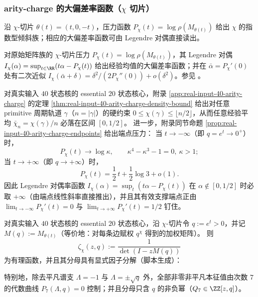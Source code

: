 \subsubsection{arity-charge 的大偏差率函数（\texorpdfstring{$\chi$}{chi} 切片）}\label{subsec:chi-ldp}
沿 $\chi$-切片 $\theta(t)=(t,0,-t)$，压力函数 $P_\chi(t)=\log\rho(M_{\theta(t)})$ 给出 $\chi$ 的指数型倾斜族；相应的大偏差率函数可由 Legendre 对偶直接读出。

\begin{remark}\label{thm:chi-gartner-ellis}
对原始矩阵族的 \(\chi\)-切片压力 \(P_\chi(t)=\log\rho(M_{\theta(t)})\)，其 Legendre 对偶
\(
I_\chi(\alpha)=\sup_{t\in\RR}(t\alpha-P_\chi(t))
\)
给出经验均值的大偏差率函数；并在 \(\bar\alpha=P_\chi'(0)\) 处有二次近似 \(I_\chi(\bar\alpha+\delta)=\delta^2/(2P_\chi''(0))+o(\delta^2)\)。参见 \cite{DemboZeitouni2010LargeDeviations}。
\end{remark}

\begin{remark}\label{rem:chi-ldp-endpoints}
对真实输入 $40$ 状态核的 essential $20$ 状态核心，附录 \ref{app:real-input-40-arity-charge} 的定理
\ref{thm:real-input-40-arity-charge-density-bound}
给出对任意 primitive 周期轨道 $\gamma$（$n=|\gamma|$）的硬约束
\(
0\le \chi(\gamma)\le \lfloor n/2\rfloor
\)，从而任意经验平均
\(
\bar\chi_n=\chi(\gamma)/n
\)
必落在区间 $[0,1/2]$。
进一步，附录同节命题 \ref{prop:real-input-40-arity-charge-endpoints} 给出端点压力：
当 $t\to-\infty$（即 $q=e^t\to 0^+$）时，
\[
P_\chi(t)\to \log\kappa,
\qquad
\kappa^4-\kappa^3-1=0,\ \kappa>1;
\]
当 $t\to+\infty$（即 $q\to+\infty$）时，
\[
P_\chi(t)=\frac12\,t+\frac12\log 3+o(1).
\]
因此 Legendre 对偶率函数 $I_\chi(\alpha)=\sup_t(t\alpha-P_\chi(t))$ 在 $\alpha\notin[0,1/2]$ 时必取 $+\infty$（由端点线性斜率直接推出），并且其有效支撑端点正由
\(
\lim_{t\to-\infty}P_\chi'(t)=0
\)
与
\(
\lim_{t\to+\infty}P_\chi'(t)=1/2
\)
钉住。
\end{remark}

\begin{proposition}\label{prop:chi-degree7-interface}
对真实输入 \(40\) 状态核的 essential \(20\) 状态核心，沿 \(\chi\)-切片令 \(q:=e^t>0\)，并记 \(M(q):=M_{\theta(t)}\)（等价地：对每条边赋权 \(q^{\chi}\) 得到的加权矩阵）。
则
\[
\zeta_\chi(z,q):=\frac{1}{\det(I-zM(q))}
\]
为有理函数，并且其分母具有显式因子分解（脚本生成）：

特别地，除去平凡谱支 \(\Lambda=-1\) 与 \(\Lambda=\pm\sqrt q\) 外，全部非零非平凡本征值由次数 \(7\) 的代数曲线 \(P_7(\Lambda,q)=0\) 控制；并且分母只含 \(q\) 的非负幂（\(Q_7\in\ZZ[z,q]\)）。
\end{proposition}

